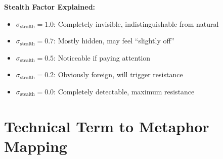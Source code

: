 \documentclass[11pt,twoside]{book}
\newcommand{\StealthFactor}{\sigma_{\mathrm{stealth}}}
\begin{document}
\begin{tcolorbox}[colback=green!5!white,colframe=green!65!black,title=\textbf{Plain English: The ``Psychological Surgery Blueprint''},breakable]
\textbf{Stealth Factor Explained:}
\begin{itemize}
    \item $\StealthFactor = 1.0$: Completely invisible, indistinguishable from natural
    \item $\StealthFactor = 0.7$: Mostly hidden, may feel ``slightly off''
    \item $\StealthFactor = 0.5$: Noticeable if paying attention
    \item $\StealthFactor = 0.2$: Obviously foreign, will trigger resistance
    \item $\StealthFactor = 0.0$: Completely detectable, maximum resistance
\end{itemize}

\end{tcolorbox}

\section{Technical Term to Metaphor Mapping}
\end{document}
